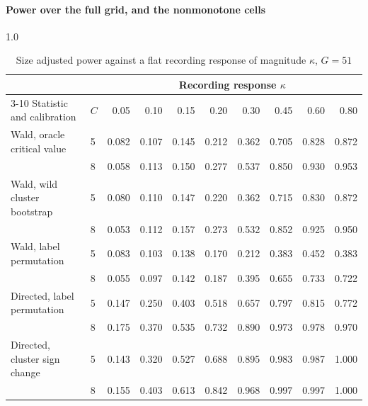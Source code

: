 \documentclass[12pt]{article}
\theoremstyle{definition}
\numberwithin{equation}{section}
\begin{document}
\paragraph{Power over the full grid, and the nonmonotone cells}

\begin{table}[htbp]
\centering
\small
\begin{spacing}{1.0}
\caption{Size adjusted power against a flat recording response of magnitude
$\kappa$, $G = 51$}
\label{tab:power}
\begin{tabular}{llrrrrrrrr}
\toprule
 & & \multicolumn{8}{c}{Recording response $\kappa$} \\
\cmidrule(lr){3-10}
Statistic and calibration & $C$ & 0.05 & 0.10 & 0.15 & 0.20 & 0.30 & 0.45 & 0.60 & 0.80 \\
\midrule
Wald, oracle critical value   & 5 & 0.082 & 0.107 & 0.145 & 0.212 & 0.362 & 0.705 & 0.828 & 0.872 \\
                              & 8 & 0.058 & 0.113 & 0.150 & 0.277 & 0.537 & 0.850 & 0.930 & 0.953 \\
\addlinespace
Wald, wild cluster bootstrap  & 5 & 0.080 & 0.110 & 0.147 & 0.220 & 0.362 & 0.715 & 0.830 & 0.872 \\
                              & 8 & 0.053 & 0.112 & 0.157 & 0.273 & 0.532 & 0.852 & 0.925 & 0.950 \\
\addlinespace
Wald, label permutation       & 5 & 0.083 & 0.103 & 0.138 & 0.170 & 0.212 & 0.383 & 0.452 & 0.383 \\
                              & 8 & 0.055 & 0.097 & 0.142 & 0.187 & 0.395 & 0.655 & 0.733 & 0.722 \\
\addlinespace
Directed, label permutation   & 5 & 0.147 & 0.250 & 0.403 & 0.518 & 0.657 & 0.797 & 0.815 & 0.772 \\
                              & 8 & 0.175 & 0.370 & 0.535 & 0.732 & 0.890 & 0.973 & 0.978 & 0.970 \\
\addlinespace
Directed, cluster sign change & 5 & 0.143 & 0.320 & 0.527 & 0.688 & 0.895 & 0.983 & 0.987 & 1.000 \\
                              & 8 & 0.155 & 0.403 & 0.613 & 0.842 & 0.968 & 0.997 & 0.997 & 1.000 \\
\bottomrule
\end{tabular}


\end{spacing}
\end{table}
\end{document}
